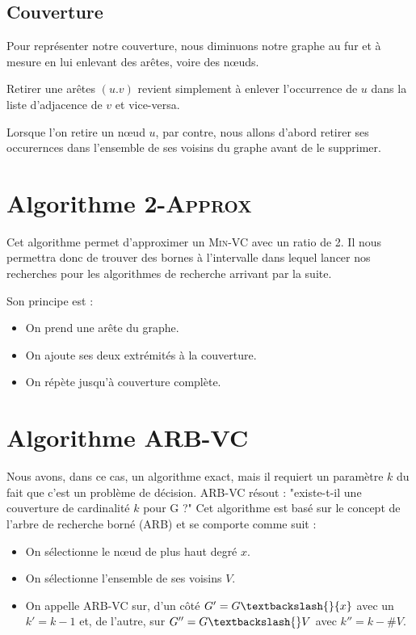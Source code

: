 \documentclass[a4paper,10pt,twoside]{report}
\begin{document}
        \subsection{Couverture}
        Pour représenter notre couverture, nous diminuons notre graphe au fur et à mesure en lui enlevant des arêtes, voire des n\oe{}uds.
        
        Retirer une arêtes $(u.v)$ revient simplement à enlever l'occurrence de $u$ dans la liste d'adjacence de $v$ et vice-versa.
        
        Lorsque l'on retire un n\oe{}ud $u$, par contre, nous allons d'abord retirer ses occurernces dans l'ensemble de ses voisins du graphe avant de le supprimer.

    \section{Algorithme \textsc{2-Approx}}
    Cet algorithme permet d'approximer un \textsc{Min-VC} avec un ratio de 2. Il nous permettra donc de trouver des bornes à l'intervalle dans lequel lancer nos recherches pour les algorithmes de recherche arrivant par la suite.
    
    Son principe est :
    \begin{itemize}
        \item On prend une arête du graphe.
        \item On ajoute ses deux extrémités à la couverture.
        \item On répète jusqu'à couverture complète.
    \end{itemize}
    
    \section{Algorithme \textsc{ARB-VC}}
    Nous avons, dans ce cas, un algorithme exact, mais il requiert un paramètre $k$ du fait que c'est un problème de décision. \textsc{ARB-VC} résout : "existe-t-il une couverture de cardinalité $k$ pour G ?"
    Cet algorithme est basé sur le concept de l'arbre de recherche borné (ARB) et se comporte comme suit :
    \begin{itemize}
        \item On sélectionne le n\oe{}ud de plus haut degré $x$.
        \item On sélectionne l'ensemble de ses voisins $V$.
        \item On appelle \textsc{ARB-VC} sur, d'un côté $G' = G \textbackslash{} \{x\}$ avec un $k' = k - 1$ et, de l'autre, sur $G'' = G \textbackslash{} V$ avec $k'' = k - \#V$.
    \end{itemize}
    
\end{document}
